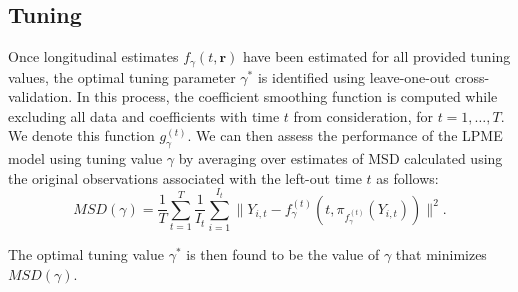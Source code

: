 \documentclass[11pt,reqno]{article}
\theoremstyle{definition}
\begin{document}
\subsection*{Tuning}

Once longitudinal estimates $f_{\gamma}(t, \mathbf{r})$ have been estimated for all provided tuning values, the optimal tuning parameter $\gamma^*$ is identified using leave-one-out cross-validation. In this process, the coefficient smoothing function is computed while excluding all data and coefficients with time $t$ from consideration, for $t = 1, \dots, T$. We denote this function $g_{\gamma}^{(t)}$. We can then assess the performance of the LPME model using tuning value $\gamma$ by averaging over estimates of MSD calculated using the original observations associated with the left-out time $t$ as follows:
\[%
  MSD(\gamma) = \frac{1}{T} \sum_{t=1}^{T}\frac{1}{I_t}\sum_{i=1}^{I_t}\|Y_{i, t} - f_{\gamma}^{(t)}(t, \pi_{f_{\gamma}^{(t)}}(Y_{i, t}))\|^2
.\]%

The optimal tuning value $\gamma^*$ is then found to be the value of $\gamma$ that minimizes $MSD(\gamma)$.

\LinesNumbered


\LinesNumbered
\end{document}

